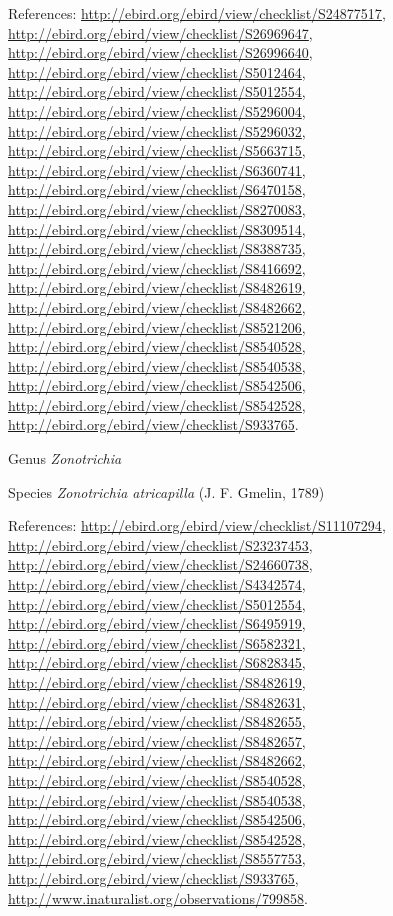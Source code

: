 \documentclass[9pt, article]{memoir}
\begin{document}
\begin{multicols}{2}
\vspace{6pt}References: 
\url{http://ebird.org/ebird/view/checklist/S24877517}, 
\url{http://ebird.org/ebird/view/checklist/S26969647}, 
\url{http://ebird.org/ebird/view/checklist/S26996640}, 
\url{http://ebird.org/ebird/view/checklist/S5012464}, 
\url{http://ebird.org/ebird/view/checklist/S5012554}, 
\url{http://ebird.org/ebird/view/checklist/S5296004}, 
\url{http://ebird.org/ebird/view/checklist/S5296032}, 
\url{http://ebird.org/ebird/view/checklist/S5663715}, 
\url{http://ebird.org/ebird/view/checklist/S6360741}, 
\url{http://ebird.org/ebird/view/checklist/S6470158}, 
\url{http://ebird.org/ebird/view/checklist/S8270083}, 
\url{http://ebird.org/ebird/view/checklist/S8309514}, 
\url{http://ebird.org/ebird/view/checklist/S8388735}, 
\url{http://ebird.org/ebird/view/checklist/S8416692}, 
\url{http://ebird.org/ebird/view/checklist/S8482619}, 
\url{http://ebird.org/ebird/view/checklist/S8482662}, 
\url{http://ebird.org/ebird/view/checklist/S8521206}, 
\url{http://ebird.org/ebird/view/checklist/S8540528}, 
\url{http://ebird.org/ebird/view/checklist/S8540538}, 
\url{http://ebird.org/ebird/view/checklist/S8542506}, 
\url{http://ebird.org/ebird/view/checklist/S8542528}, 
\url{http://ebird.org/ebird/view/checklist/S933765}.

\vspace{6pt}\noindent\hspace{30pt}Genus \textit{Zonotrichia}


\vspace{6pt}\noindent\hspace{36pt}Species \textit{Zonotrichia atricapilla} (J. F. Gmelin, 1789)


\vspace{6pt}References: 
\url{http://ebird.org/ebird/view/checklist/S11107294}, 
\url{http://ebird.org/ebird/view/checklist/S23237453}, 
\url{http://ebird.org/ebird/view/checklist/S24660738}, 
\url{http://ebird.org/ebird/view/checklist/S4342574}, 
\url{http://ebird.org/ebird/view/checklist/S5012554}, 
\url{http://ebird.org/ebird/view/checklist/S6495919}, 
\url{http://ebird.org/ebird/view/checklist/S6582321}, 
\url{http://ebird.org/ebird/view/checklist/S6828345}, 
\url{http://ebird.org/ebird/view/checklist/S8482619}, 
\url{http://ebird.org/ebird/view/checklist/S8482631}, 
\url{http://ebird.org/ebird/view/checklist/S8482655}, 
\url{http://ebird.org/ebird/view/checklist/S8482657}, 
\url{http://ebird.org/ebird/view/checklist/S8482662}, 
\url{http://ebird.org/ebird/view/checklist/S8540528}, 
\url{http://ebird.org/ebird/view/checklist/S8540538}, 
\url{http://ebird.org/ebird/view/checklist/S8542506}, 
\url{http://ebird.org/ebird/view/checklist/S8542528}, 
\url{http://ebird.org/ebird/view/checklist/S8557753}, 
\url{http://ebird.org/ebird/view/checklist/S933765}, 
\url{http://www.inaturalist.org/observations/799858}.


\end{multicols}
\end{document}

